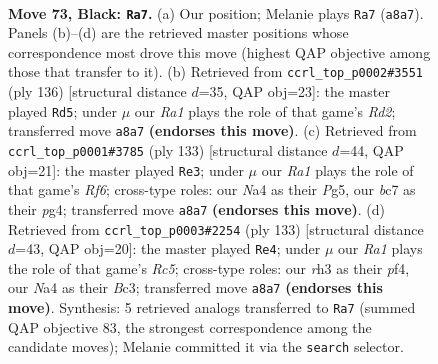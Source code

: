 \documentclass[11pt]{article}
\begin{document}
\clearpage

\begin{figure}[p]\centering
\begin{subfigure}{0.46\textwidth}\centering
\resizebox{\linewidth}{!}{%
\newchessgame
\chessboard[
  setfen={r7/1BB5/3p1k1p/4p1b1/n3P2p/5P1R/4K3/8 b - - 16 73},
  showmover=false,
  pgfstyle=straightmove, color=movearrow, markmove={a8-a7}
]}
\caption{}
\end{subfigure}\hfill
\begin{subfigure}{0.46\textwidth}\centering
\resizebox{\linewidth}{!}{%
\newchessgame
\chessboard[
  setfen={8/8/6pk/7p/7P/4rPPK/3R2B1/4b3 w - - 10 69},
  showmover=false,
  pgfstyle=straightmove, color=movearrow, markmove={d2-d5}
]}
\caption{}
\end{subfigure}
\\[4pt]
\begin{subfigure}{0.46\textwidth}\centering
\resizebox{\linewidth}{!}{%
\newchessgame
\chessboard[
  setfen={8/5pk1/P7/1K2p1p1/4P1P1/2b2r2/R2pB3/8 b - - 1 67},
  showmover=false,
  pgfstyle=straightmove, color=movearrow, markmove={f3-e3}
]}
\caption{}
\end{subfigure}\hfill
\begin{subfigure}{0.46\textwidth}\centering
\resizebox{\linewidth}{!}{%
\newchessgame
\chessboard[
  setfen={8/6k1/5pp1/7p/2r2P1P/1BbNB3/6PK/8 b - - 2 67},
  showmover=false,
  pgfstyle=straightmove, color=movearrow, markmove={c4-e4}
]}
\caption{}
\end{subfigure}
\caption{\textbf{Move 73, Black: \texttt{Ra7}.} (a) Our position; Melanie plays \texttt{Ra7} (\texttt{a8a7}). Panels (b)--(d) are the retrieved master positions whose correspondence most drove this move (highest QAP objective among those that transfer to it). (b) Retrieved from \texttt{ccrl\_top\_p0002\#3551} (ply 136) [structural distance $d$=35, QAP obj=23]: the master played \texttt{Rd5}; under $\mu$ our \emph{Ra1} plays the role of that game's \emph{Rd2}; transferred move \texttt{a8a7} \textbf{(endorses this move)}. (c) Retrieved from \texttt{ccrl\_top\_p0001\#3785} (ply 133) [structural distance $d$=44, QAP obj=21]: the master played \texttt{Re3}; under $\mu$ our \emph{Ra1} plays the role of that game's \emph{Rf6}; cross-type roles: our \emph{N}a4 as their \emph{P}g5, our \emph{b}c7 as their \emph{p}g4; transferred move \texttt{a8a7} \textbf{(endorses this move)}. (d) Retrieved from \texttt{ccrl\_top\_p0003\#2254} (ply 133) [structural distance $d$=43, QAP obj=20]: the master played \texttt{Re4}; under $\mu$ our \emph{Ra1} plays the role of that game's \emph{Rc5}; cross-type roles: our \emph{r}h3 as their \emph{p}f4, our \emph{N}a4 as their \emph{B}c3; transferred move \texttt{a8a7} \textbf{(endorses this move)}. Synthesis: 5 retrieved analogs transferred to \texttt{Ra7} (summed QAP objective 83, the strongest correspondence among the candidate moves); Melanie committed it via the \texttt{search} selector.}
\label{fig:thought-m145}
\end{figure}
\end{document}
